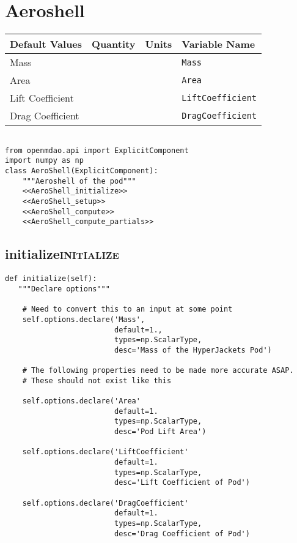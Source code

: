 \documentclass[11pt]{article}
\author{grokkingStuff}
\date{\today}
\title{}
\begin{document}
\tableofcontents

\section{Aeroshell}
\label{sec:org8e975d1}

\begin{center}
\begin{tabular}{llll}
Default Values & Quantity & Units & Variable Name\\
\hline
Mass &  &  & \texttt{Mass}\\
Area &  &  & \texttt{Area}\\
Lift Coefficient &  &  & \texttt{LiftCoefficient}\\
Drag Coefficient &  &  & \texttt{DragCoefficient}\\
\end{tabular}
\end{center}


\begin{verbatim}

from openmdao.api import ExplicitComponent
import numpy as np
class AeroShell(ExplicitComponent):
    """Aeroshell of the pod"""
    <<AeroShell_initialize>>
    <<AeroShell_setup>>
    <<AeroShell_compute>>
    <<AeroShell_compute_partials>>
\end{verbatim}

\subsection{initialize\hfill{}\textsc{initialize}}
\label{sec:org4fea988}
\begin{verbatim}
def initialize(self):
   """Declare options"""

    # Need to convert this to an input at some point
    self.options.declare('Mass', 
                         default=1.,
                         types=np.ScalarType,
                         desc='Mass of the HyperJackets Pod')

    # The following properties need to be made more accurate ASAP.
    # These should not exist like this

    self.options.declare('Area'
                         default=1.
                         types=np.ScalarType,
                         desc='Pod Lift Area')

    self.options.declare('LiftCoefficient'
                         default=1.
                         types=np.ScalarType,
                         desc='Lift Coefficient of Pod')

    self.options.declare('DragCoefficient'
                         default=1.
                         types=np.ScalarType,
                         desc='Drag Coefficient of Pod')
\end{verbatim}
\end{document}
